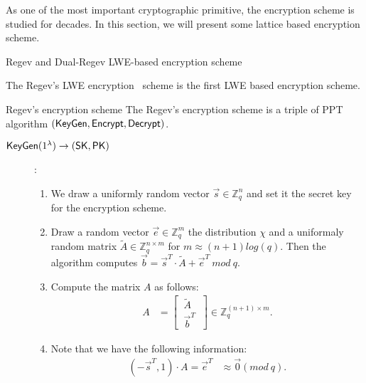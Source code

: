 As one of the most important cryptographic primitive, the encryption scheme is studied for decades. In this section, we will present some lattice based encryption scheme.

\begin{section}{Regev and Dual-Regev LWE-based encryption scheme}
  
The Regev's LWE encryption~\cite{DBLP:conf/stoc/Regev05} scheme is the first LWE based encryption scheme.

\begin{construction}{Regev's encryption scheme}
  The Regev's encryption scheme is a triple of PPT algorithm $({\mathsf{KeyGen}}, {\mathsf{Encrypt}}, {\mathsf{Decrypt}})$.
  \begin{description}
  \item[${\mathsf{KeyGen}}(1^\lambda) \to (\mathsf{SK}, \mathsf{PK})$]: 
    \begin{enumerate}
    \item We draw a uniformly random vector $\vec{s} \in \mathbb{Z}_q^n$ and set it the secret key for the encryption scheme.
    \item Draw a random vector $\vec{e} \in \mathbb{Z}_q^m$ \wrt the distribution $\chi$ and a uniformaly random matrix $\tilde{A} \in \mathbb{Z}_q^{n \times m}$ for $m \approx (n+1) log(q)$. Then the algorithm computes $\vec{b} = \vec{s}^T \cdot \tilde{A} + \vec{e}^T~mod~q$.
    \item Compute the matrix $A$ as follows:
      \begin{align*}
        A &= \left[ \begin{matrix} ~\tilde{A}~ \\ ~\vec{b}^T~ \end{matrix} \right] \in \mathbb{Z}_q^{(n+1) \times m}.
      \end{align*}
    \item Note that we have the following information:
      \begin{align*}
        (-\vec{s}^T, 1) \cdot A = \vec{e}^T &\approx \vec{0} (mod~ q).
      \end{align*}
    \end{enumerate}
  \end{description}
\end{construction}
  

\end{section}